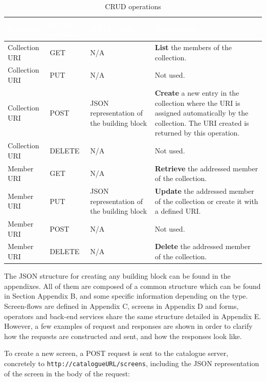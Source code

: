 \documentclass{fast_latex}
\begin{document}
\begin{table}[htb!]
\caption{CRUD operations}
\label{tab:crud_operations}
\begin{center}
\begin{tabular}{|p{2.5cm}|p{2.5cm}|p{3.5cm}|p{5cm}|}
\hline
\rowcolor{fast@lightgrey}\textcolor{white}{Resource} &
                         \textcolor{white}{HTTP method} &
                         \textcolor{white}{HTTP body} &
                         \textcolor{white}{Description}\\ \hline
Collection URI & GET & N/A & \textbf{List} the members of the collection.\\ \hline
Collection URI & PUT & N/A & Not used.\\ \hline
Collection URI & POST & JSON representation of the building block & \textbf{Create} a new entry in the collection where the URI is assigned automatically by the collection. The URI created is returned by this operation.\\ \hline
Collection URI & DELETE & N/A & Not used.\\ \hline
Member URI & GET & N/A & \textbf{Retrieve} the addressed member of the collection.\\ \hline
Member URI & PUT & JSON representation of the building block & \textbf{Update} the addressed member of the collection or create it with a defined URI.\\ \hline
Member URI & POST & N/A & Not used. \\ \hline
Member URI & DELETE & N/A & \textbf{Delete} the addressed member of the collection.\\ \hline
\end{tabular}
\end{center}
\end{table}

The JSON structure for creating any building block can be found in the appendixes. All of them are composed of a common structure which can be found in Section Appendix B, and some specific information depending on the type. Screen-flows are defined in Appendix C, screens in Appendix D and forms, operators and back-end services share the same structure detailed in Appendix E. However, a few examples of request and responses are shown in order to clarify how the requests are constructed and sent, and how the responses look like.

To create a new screen, a POST request is sent to the catalogue server, concretely to \texttt{http://cata\-logueURL/screens}, including the JSON representation of the screen in the body of the request:
\end{document}
